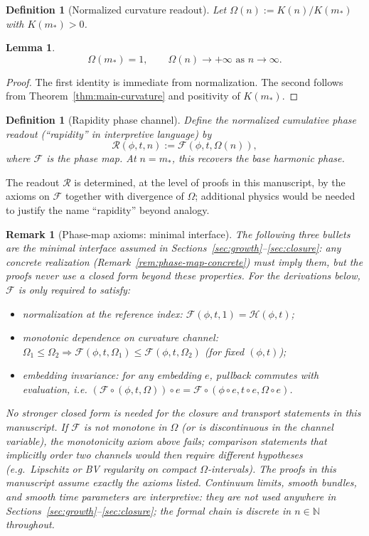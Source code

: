 \documentclass[11pt]{amsart}
\newtheorem{lemma}[theorem]{Lemma}
\newtheorem{definition}[theorem]{Definition}
\newtheorem{remark}[theorem]{Remark}
\begin{document}
\begin{definition}[Normalized curvature readout]
Let $\Omega(n):=K(n)/K(m_\ast)$ with $K(m_\ast)>0$.
\end{definition}

\begin{lemma}
\[
\Omega(m_\ast)=1,\qquad \Omega(n)\to +\infty \text{ as } n\to\infty.
\]
\end{lemma}

\begin{proof}
The first identity is immediate from normalization. The second follows from
Theorem~\ref{thm:main-curvature} and positivity of $K(m_\ast)$.
\end{proof}

\begin{definition}[Rapidity phase channel]
Define the \emph{normalized cumulative phase readout} (``rapidity'' in interpretive language) by
\[
\mathcal R(\phi,t,n):=\mathcal F(\phi,t,\Omega(n)),
\]
where $\mathcal F$ is the phase map. At $n=m_\ast$, this recovers the base harmonic phase.
\end{definition}

The readout \(\mathcal R\) is determined, at the level of proofs in this manuscript, by the axioms on \(\mathcal F\) together with divergence of \(\Omega\); additional physics would be needed to justify the name ``rapidity'' beyond analogy.

\begin{remark}[Phase-map axioms: minimal interface]
\label{rem:phase-map-interface}
The following three bullets are the \emph{minimal interface} assumed in Sections~\ref{sec:growth}--\ref{sec:closure}: any concrete realization (Remark~\ref{rem:phase-map-concrete}) must imply them, but the proofs never use a closed form beyond these properties.
For the derivations below, $\mathcal F$ is only required to satisfy:
\begin{itemize}
  \item normalization at the reference index: $\mathcal F(\phi,t,1)=\mathcal H(\phi,t)$;
  \item monotonic dependence on curvature channel: $\Omega_1\le \Omega_2 \Rightarrow \mathcal F(\phi,t,\Omega_1)\le \mathcal F(\phi,t,\Omega_2)$ (for fixed $(\phi,t)$);
  \item embedding invariance: for any embedding $e$, pullback commutes with evaluation, i.e. $(\mathcal F\circ(\phi,t,\Omega))\circ e=\mathcal F\circ(\phi\circ e,t\circ e,\Omega\circ e)$.
\end{itemize}
No stronger closed form is needed for the closure and transport statements in this manuscript.
If \(\mathcal F\) is not monotone in \(\Omega\) (or is discontinuous in the channel variable), the monotonicity axiom above fails; comparison statements that implicitly order two channels would then require different hypotheses (e.g.\ Lipschitz or BV regularity on compact \(\Omega\)-intervals). The proofs in this manuscript assume exactly the axioms listed.
Continuum limits, smooth bundles, and smooth time parameters are \emph{interpretive}: they are not used anywhere in Sections~\ref{sec:growth}--\ref{sec:closure}; the formal chain is discrete in \(n\in\mathbb N\) throughout.
\end{remark}
\end{document}
